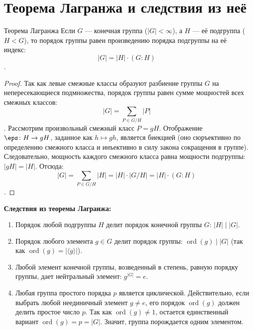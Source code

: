 
\section{Теорема Лагранжа и следствия из неё}

\begin{Theorem}{Теорема Лагранжа}{}
	Если $G$ --- конечная группа ($|G| < \infty$), а $H$ --- её подгруппа ($H < G$), то порядок группы равен произведению порядка подгруппы на её индекс:
	\[
	|G| = |H|\cdot (G:H)
	\].
\end{Theorem}

\begin{proof}
	Так как левые смежные классы образуют разбиение группы $G$ на непересекающиеся подмножества, порядок группы равен сумме мощностей всех смежных классов:
	\[
	|G| = \sum_{P \in G \slash H } |P|
	\].
	Рассмотрим произвольный смежный класс $P = gH$. Отображение $\eps \colon H \to gH$, заданное как $h \mapsto gh$, является биекцией (оно сюръективно по определению смежного класса и инъективно в силу закона сокращения в группе).
	Следовательно, мощность каждого смежного класса равна мощности подгруппы: $|gH| = |H|$.
	Отсюда:
	\[
	|G| = \sum_{P \in G \slash H} |H| = |H| \cdot |G \slash H| = |H| \cdot (G:H)
	\].
\end{proof}

\textbf{Следствия из теоремы Лагранжа:}
\begin{enumerate}
	\item Порядок любой подгруппы $H$ делит порядок конечной группы $G$: $|H| \mid |G|$.
	\item Порядок любого элемента $g \in G$ делит порядок группы: $\operatorname{ord}(g) \mid |G|$ (так как $\operatorname{ord}(g) = |\langle g \rangle|$).
	\item Любой элемент конечной группы, возведенный в степень, равную порядку группы, дает нейтральный элемент: $g^{|G|} = e$.
	\item Любая группа простого порядка $p$ является циклической. Действительно, если выбрать любой неединичный элемент $g \ne e$, его порядок $\operatorname{ord}(g)$ должен делить простое число $p$. Так как $\operatorname{ord}(g) \ne 1$, остается единственный вариант $\operatorname{ord}(g) = p = |G|$. Значит, группа порождается одним элементом.
\end{enumerate}
